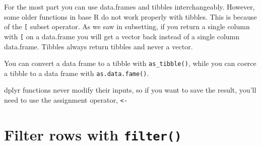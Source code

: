 \documentclass[]{book}
\newenvironment{Shaded}{\begin{snugshade}}{\end{snugshade}}
\newcommand{\KeywordTok}[1]{\textcolor[rgb]{0.13,0.29,0.53}{\textbf{#1}}}
\newcommand{\DataTypeTok}[1]{\textcolor[rgb]{0.13,0.29,0.53}{#1}}
\newcommand{\DecValTok}[1]{\textcolor[rgb]{0.00,0.00,0.81}{#1}}
\newcommand{\StringTok}[1]{\textcolor[rgb]{0.31,0.60,0.02}{#1}}
\newcommand{\CommentTok}[1]{\textcolor[rgb]{0.56,0.35,0.01}{\textit{#1}}}
\newcommand{\OperatorTok}[1]{\textcolor[rgb]{0.81,0.36,0.00}{\textbf{#1}}}
\newcommand{\NormalTok}[1]{#1}
\let\BeginKnitrBlock\begin \let\EndKnitrBlock\end
\begin{document}
\begin{Shaded}
\end{Shaded}

For the most part you can use data.frames and tibbles interchangeably.
However, some older functions in base R do not work properly with
tibbles. This is because of the \texttt{{[}} subset operator. As we saw
in subsetting, if you return a single column with \texttt{{[}} on a
data.frame you will get a vector back instead of a single column
data.frame. Tibbles always return tibbles and never a vector.

You can convert a data frame to a tibble with \texttt{as\_tibble()},
while you can coerce a tibble to a data frame with
\texttt{as.data.fame()}.

\BeginKnitrBlock{rmdimportant}
dplyr functions never modify their inputs, so if you want to save the
result, you'll need to use the assignment operator,
\texttt{\textless{}-}
\EndKnitrBlock{rmdimportant}

\section{\texorpdfstring{Filter rows with
\texttt{filter()}}{Filter rows with filter()}}\label{filter-rows-with-filter}
\end{document}

